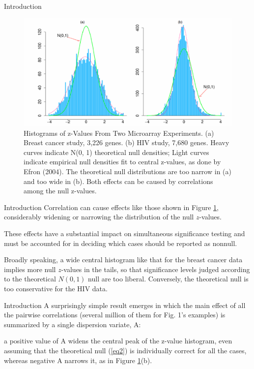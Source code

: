 \documentclass{beamer}
\begin{document}
\begin{frame}[t]{Introduction}\vspace{10pt}
\begin{figure}[h]
	\centering
	\includegraphics[scale=0.35]{efron2007figure1}
	\caption{ \footnotesize{Histograms of z-Values From Two Microarray Experiments. (a) Breast cancer study, 3,226 genes. (b) HIV study, 7,680 genes. Heavy curves indicate N(0, 1) theoretical null densities; Light curves indicate empirical null densities fit to central z-values, as done by Efron (2004). The theoretical null distributions are too narrow in (a) and too wide in (b). Both effects can be caused by correlations among the null z-values.}}
	\label{fig1}
\end{figure}
\end{frame}

\begin{frame}[t]{Introduction}\vspace{10pt}
Correlation can cause effects like those shown in Figure \ref{fig1}, considerably widening or narrowing the distribution of the null $z$-values.

These effects have a substantial impact on simultaneous significance testing and must be accounted for in deciding which cases should be reported as nonnull.

Broadly speaking, a wide central histogram like that for the breast cancer data implies more null $z$-values in the tails, so that significance levels judged according to the theoretical $N(0, 1)$ null are too liberal. Conversely, the theoretical null is too conservative for the HIV data.

\end{frame}

\begin{frame}[t]{Introduction}\vspace{10pt}
A surprisingly simple result emerges in which the main effect of all the pairwise correlations (several million of them for Fig. 1’s examples) is summarized by a single dispersion variate, A: 

a positive value of A widens the central peak of the z-value histogram, even assuming that the theoretical null (\ref{eq2}) is individually correct for all the cases, whereas negative A narrows it, as in Figure \ref{fig1}(b).
\end{frame}
\end{document}
